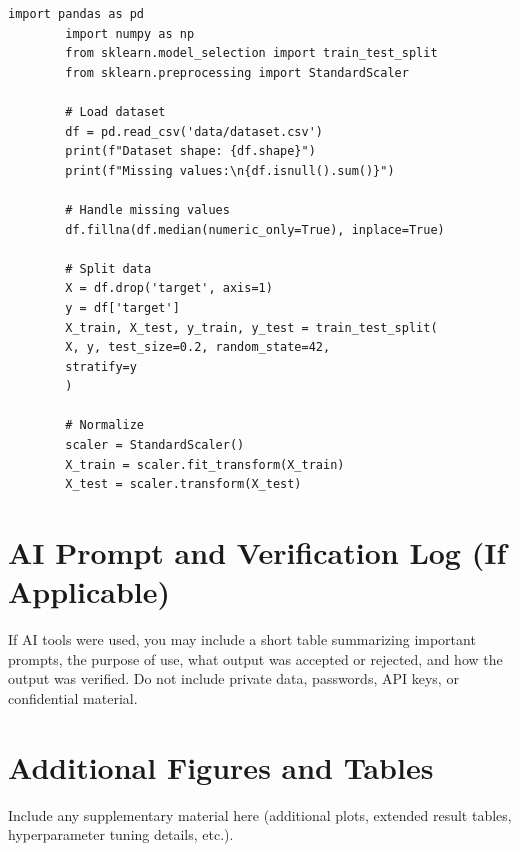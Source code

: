 \documentclass[conference]{IEEEtran}
\begin{document}
	\begin{lstlisting}[caption={Example: Data Loading and Preprocessing}, label={lst:preprocess}]
		import pandas as pd
		import numpy as np
		from sklearn.model_selection import train_test_split
		from sklearn.preprocessing import StandardScaler
		
		# Load dataset
		df = pd.read_csv('data/dataset.csv')
		print(f"Dataset shape: {df.shape}")
		print(f"Missing values:\n{df.isnull().sum()}")
		
		# Handle missing values
		df.fillna(df.median(numeric_only=True), inplace=True)
		
		# Split data
		X = df.drop('target', axis=1)
		y = df['target']
		X_train, X_test, y_train, y_test = train_test_split(
		X, y, test_size=0.2, random_state=42,
		stratify=y
		)
		
		# Normalize
		scaler = StandardScaler()
		X_train = scaler.fit_transform(X_train)
		X_test = scaler.transform(X_test)
	\end{lstlisting}
	
	\section{AI Prompt and Verification Log (If Applicable)}
	\label{app:ai_log}
	
	If AI tools were used, you may include a short table summarizing important prompts, the purpose of use, what output was accepted or rejected, and how the output was verified. Do not include private data, passwords, API keys, or confidential material.
	
	\section{Additional Figures and Tables}
	\label{app:additional}
	
	Include any supplementary material here (additional plots, extended result tables, hyperparameter tuning details, etc.).
	
\end{document}
